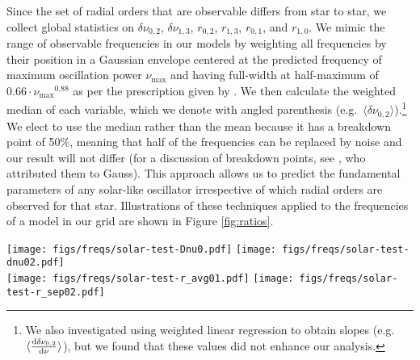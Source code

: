 \documentclass[manuscript]{aastex}
\begin{document}
Since the set of radial orders that are observable differs from star to star, we collect global statistics on $\delta\nu_{0,2}$, $\delta\nu_{1,3}$, $r_{0,2}$, $r_{1,3}$, $r_{0,1}$, and $r_{1,0}$. %
We mimic the range of observable frequencies in our models by weighting all frequencies by their position in a Gaussian envelope centered at the predicted frequency of maximum oscillation power $\nu_{\max}$ and having full-width at half-maximum of $0.66\cdot\nu_{\max}{}^{0.88}$ as per the prescription given by \citet{2012A&A...537A..30M}. We then calculate the weighted median of each variable, which we denote with angled parenthesis (e.g.~$\langle\delta\nu_{0,2}\rangle$).\footnote{We also investigated using weighted linear regression to obtain slopes (e.g.~$\langle\dv{\delta\nu_{0,2}}{\nu}\rangle$), but we found that these values did not enhance our analysis.} We elect to use the median rather than the mean because it has a breakdown point of 50\%, meaning that half of the frequencies can be replaced by noise and our result will not differ (for a discussion of breakdown points, see \citealt{hampel1971general}, who attributed them to Gauss). This approach allows us to predict the fundamental parameters of any solar-like oscillator irrespective of which radial orders are observed for that star. Illustrations of these techniques applied to the frequencies of a model in our grid are shown in Figure \ref{fig:ratios}. 

\begin{figure*}
    \centering
    \texttt{[image: figs/freqs/solar-test-Dnu0.pdf]}\hfill
    \texttt{[image: figs/freqs/solar-test-dnu02.pdf]}\\
    \texttt{[image: figs/freqs/solar-test-r\_avg01.pdf]}\hfill
    \texttt{[image: figs/freqs/solar-test-r\_sep02.pdf]}%
    \caption{The large and small frequency separations $\Delta\nu_0$ and $\delta\nu_{0,2}$ and frequency ratios $r_{0,1}$ and $r_{0,2}$ of a stellar model. The vertical dotted line indicates $\nu_{\max}$. A $\nu_{\max}$-weighted linear fit is indicated with a dashed diagonal line to guide the eye. Point sizes and colors are proportional to the applied weighting, with blue points having a large influence and red points having little. }%
    \label{fig:ratios}
\end{figure*}
\end{document}
